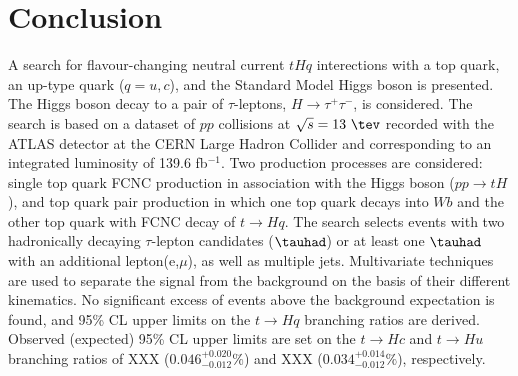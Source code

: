 \section{Conclusion}
\label{sec:conclusion}

A search for flavour-changing neutral current $tHq$ interections with a top quark,	an up-type quark ($q=u, c$), and the
Standard Model Higgs boson is presented. The Higgs boson decay to a pair of $\tau$-leptons, $H\rightarrow \tau^+\tau^-$, is considered.
The search is based on a dataset of $pp$ collisions at $\sqrt{s}=13~\tev$ recorded with the ATLAS detector at the
CERN Large Hadron Collider and corresponding to an integrated luminosity of 139.6 fb$^{-1}$.
Two production processes are considered:  single top quark FCNC production in association with the Higgs boson ($pp\rightarrow tH$), and top quark pair production in
which one top quark decays into $Wb$ and the other top quark with FCNC decay of $t\rightarrow Hq$.
The search selects events with two hadronically decaying $\tau$-lepton candidates ($\tauhad$) or at least one $\tauhad$ with an additional lepton(e,$\mu$),
as well as multiple jets.
Multivariate techniques are used to separate the signal from the background on the basis of their different kinematics.
No significant excess of events above the background expectation is found, and 95\% CL upper limits on the $t\to Hq$ branching ratios are derived.
Observed (expected) 95\% CL upper limits are set on the $t\to Hc$ and $t\to Hu$ branching ratios of XXX ($0.046^{+0.020}_{-0.012}\%$)
and XXX ($0.034^{+0.014}_{-0.012}\%$), respectively.
